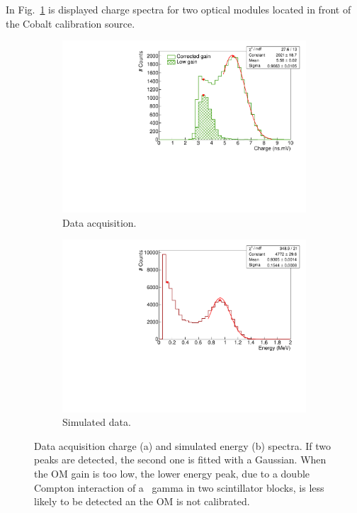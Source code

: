 In Fig.~\ref{subfig:Co_calib_charge} is displayed charge spectra for two optical modules located in front of the Cobalt calibration source.
\begin{figure}[h]
  \centering
  \begin{subfigure}[t]{0.8\textwidth}
    \centering
    \includegraphics[width=1\textwidth]{CobaltStudy/fig_CobaltStudy/ex_charge_distrib.pdf}
    \captionsetup{justification=justified}
    \caption{Data acquisition.
      \label{subfig:Co_calib_charge}}
  \end{subfigure}
  \hfill
  \begin{subfigure}[t]{0.8\textwidth}
  \centering
  \includegraphics[width=1\textwidth]{CobaltStudy/fig_CobaltStudy/ex_energy_distrib.pdf}
    \captionsetup{justification=justified}
  \caption{Simulated data.
    \label{subfig:Co_calib_energy}}
  \end{subfigure}
  \caption{Data acquisition charge (a) and simulated energy (b) spectra.
    If two peaks are detected, the second one is fitted with a Gaussian.
    When the OM gain is too low, the lower energy peak, due to a double Compton interaction of a \Co\ gamma in two scintillator blocks, is less likely to be detected an the OM is not calibrated.
    \label{fig:Co_calib}}
\end{figure}
